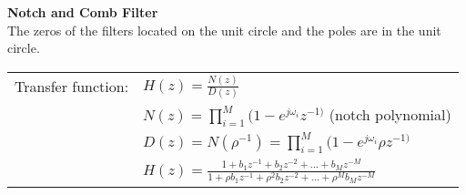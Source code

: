 \textbf{Notch and Comb Filter}
\\
The zeros of the filters located on the unit circle and the poles are in the unit
circle.

\begin{tabularx}{1\textwidth}{l X}
	Transfer function: & $H(z) = \frac{N(z)}{D(z)} $
	\\
	& $N(z) = \prod\limits_{i=1}^{M}(1- e^{j\omega_i}z^{-1)} $ \qquad (notch polynomial)
	\\
	& $D(z) = N(\rho^{-1})  = \prod\limits_{i=1}^{M}(1- e^{j\omega_i}\rho z^{-1)} $
	\\
	& $H(z) = \frac{1+b_1 z^{-1} + b_2z^{-2} + \ldots + b_M z^{-M}}
	{1+\rho b_1 z^{-1} + \rho^2 b_2z^{-2} + \ldots + \rho^M b_M z^{-M}} $
	
\end{tabularx}\\ \\

